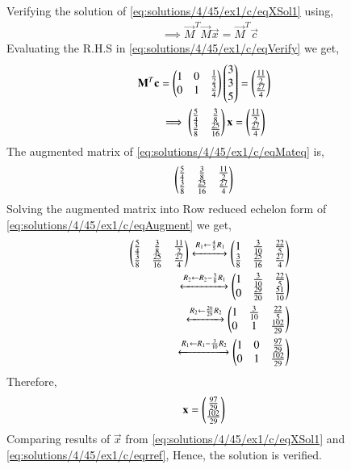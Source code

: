 Verifying the solution of \eqref{eq:solutions/4/45/ex1/c/eqXSol1} using,
\begin{align}
\implies \vec{M}^T\vec{M}\vec{x} = \vec{M}^T\vec{c}\label{eq:solutions/4/45/ex1/c/eqVerify}
\end{align}
Evaluating the R.H.S in \eqref{eq:solutions/4/45/ex1/c/eqVerify} we get,
\begin{align}
\mathbf{M}^T\mathbf{c} &= \begin{pmatrix}1&0&\frac{1}{2}\\0&1&\frac{3}{4}\end{pmatrix}\begin{pmatrix}3\\3\\5\end{pmatrix}=\begin{pmatrix}\frac{11}{2}\\\frac{27}{4}\end{pmatrix}\\
&\implies\begin{pmatrix}\frac{5}{4}&\frac{3}{8}\\\frac{3}{8}&\frac{25}{16}\end{pmatrix}\mathbf{x} = \begin{pmatrix}\frac{11}{2}\\\frac{27}{4}\end{pmatrix}&\label{eq:solutions/4/45/ex1/c/eqMateq}
\end{align}
The augmented matrix of \eqref{eq:solutions/4/45/ex1/c/eqMateq} is,
\begin{align}
\begin{pmatrix}\frac{5}{4}&\frac{3}{8} &\frac{11}{2}\\\frac{3}{8}&\frac{25}{16}&\frac{27}{4}\end{pmatrix} & \label{eq:solutions/4/45/ex1/c/eqAugment}
\end{align}
Solving the augmented matrix into Row reduced echelon form of \eqref{eq:solutions/4/45/ex1/c/eqAugment} we get,
\begin{align}
\begin{pmatrix}\frac{5}{4}&\frac{3}{8} &\frac{11}{2}\\\frac{3}{8}&\frac{25}{16}&\frac{27}{4}\end{pmatrix}\xleftrightarrow[]{R_1\leftarrow\frac{4}{5}R_1}\begin{pmatrix}1&\frac{3}{10}&\frac{22}{5}\\\frac{3}{8}&\frac{25}{16}&\frac{27}{4}\end{pmatrix}\\
\xleftrightarrow[]{R_2\leftarrow R_2-\frac{3}{8}R_1}\begin{pmatrix}1&\frac{3}{10}&\frac{22}{5}\\0&\frac{29}{20}&\frac{51}{10}\end{pmatrix}\\
\xleftrightarrow[]{R_2\leftarrow \frac{20}{29}R_2}\begin{pmatrix}1&\frac{3}{10}&\frac{22}{5}\\0&1&\frac{102}{29}\end{pmatrix}\\
\xleftrightarrow[]{R_1\leftarrow R_1-\frac{3}{10}R_2}\begin{pmatrix}1&0&\frac{97}{29}\\0&1&\frac{102}{29}\end{pmatrix}
\end{align}
Therefore,
\begin{align}
   \mathbf{x}&=\begin{pmatrix}\frac{97}{29}\\\frac{102}{29}\end{pmatrix}\label{eq:solutions/4/45/ex1/c/eqrref}
\end{align}
Comparing results of $\vec{x}$ from \eqref{eq:solutions/4/45/ex1/c/eqXSol1} and \eqref{eq:solutions/4/45/ex1/c/eqrref}, Hence, the solution is verified.

